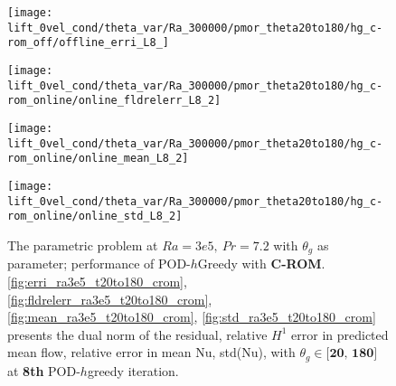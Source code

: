 \begin{figure}[h!]
    \begin{minipage}[b]{.25\linewidth}
        \centering \texttt{[image: lift\_0vel\_cond/theta\_var/Ra\_300000/pmor\_theta20to180/hg\_c-rom\_off/offline\_erri\_L8\_]}
        \label{fig:erri_ra3e5_t20to180_crom}
    \end{minipage}%
    \begin{minipage}[b]{.25\linewidth}
        \centering \texttt{[image: lift\_0vel\_cond/theta\_var/Ra\_300000/pmor\_theta20to180/hg\_c-rom\_online/online\_fldrelerr\_L8\_2]}
        \label{fig:fldrelerr_ra3e5_t20to180_crom}
    \end{minipage}
    \begin{minipage}[b]{.25\linewidth}
        \centering \texttt{[image: lift\_0vel\_cond/theta\_var/Ra\_300000/pmor\_theta20to180/hg\_c-rom\_online/online\_mean\_L8\_2]}
        \label{fig:mean_ra3e5_t20to180_crom}
    \end{minipage}%
    \begin{minipage}[b]{.25\linewidth}
        \centering \texttt{[image: lift\_0vel\_cond/theta\_var/Ra\_300000/pmor\_theta20to180/hg\_c-rom\_online/online\_std\_L8\_2]}
        \label{fig:std_ra3e5_t20to180_crom}
    \end{minipage} 
    \caption{The parametric problem at $Ra=3e5,~Pr=7.2$ with $\theta_g$ as
    parameter; performance of POD-$h$Greedy with \textbf{C-ROM}.  \ref{fig:erri_ra3e5_t20to180_crom},
    \ref{fig:fldrelerr_ra3e5_t20to180_crom}, \ref{fig:mean_ra3e5_t20to180_crom}, \ref{fig:std_ra3e5_t20to180_crom}
    presents the dual norm of the residual, relative $H^1$ error in predicted
    mean flow, relative error in mean Nu, std(Nu), with $\theta_g \in
    \textbf{[20,~180]}$ at \textbf{8th} POD-$h$greedy iteration.}
    \label{fig:online_ra3e5_t20to180_crom} 
\end{figure}
